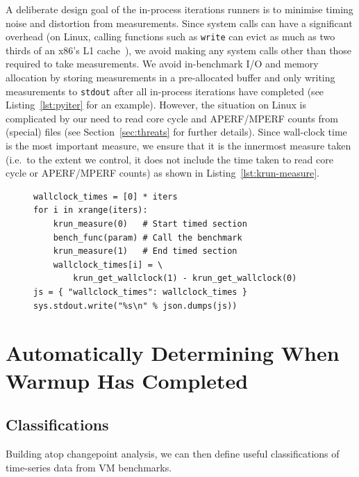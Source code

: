 \documentclass[preprint,numbers,10pt]{sigplanconf}
\begin{document}
A deliberate design goal of the in-process iterations runners is to minimise
timing noise and distortion from measurements. Since system calls can have a
significant overhead (on Linux, calling functions such as \texttt{write} can
evict as much as two thirds of an x86's L1 cache~\cite{soares10flexsc}), we
avoid making any system calls other than those required to take measurements. We
avoid in-benchmark I/O and memory allocation by storing measurements in a
pre-allocated buffer and only writing measurements to \texttt{stdout} after all
in-process iterations have completed (see Listing~\ref{lst:pyiter} for an
example). However, the situation on Linux is complicated by our need to read
core cycle and APERF/MPERF counts from (special) files (see
Section~\ref{sec:threats} for further details). Since wall-clock time
is the most important measure, we ensure that it is the innermost measure taken
(i.e.~to the extent we control, it does not include the time taken to read
core cycle or APERF/MPERF counts) as shown in Listing~\ref{lst:krun-measure}.

\begin{figure}[t]
\begin{lstlisting}[label=lst:pyiter, caption={An elided version of the Python
in-process iterations runner (with core cycles etc. removed).}]
wallclock_times = [0] * iters
for i in xrange(iters):
    krun_measure(0)   # Start timed section
    bench_func(param) # Call the benchmark
    krun_measure(1)   # End timed section
    wallclock_times[i] = \
        krun_get_wallclock(1) - krun_get_wallclock(0)
js = { "wallclock_times": wallclock_times }
sys.stdout.write("%s\n" % json.dumps(js))
\end{lstlisting}
\end{figure}


\section{Automatically Determining When Warmup Has Completed}
\label{sec:stats}



\subsection{Classifications}

Building atop changepoint analysis, we can then define useful classifications of
time-series data from VM benchmarks.
\end{document}
